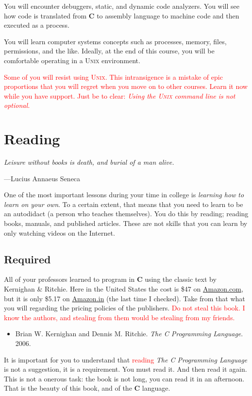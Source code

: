 \documentclass[11pt]{article}
\begin{document}
You will encounter debuggers, static, and dynamic code analyzers. You
will see how code is translated from \textbf{C} to assembly language to
machine code and then executed as a process.

You will learn computer systems concepts such as processes, memory,
files, permissions, and the like. Ideally, at the end of this course,
you will be comfortable operating in a \textsc{Unix} environment.

\textcolor{red}{Some of you will resist using \textsc{Unix}. This
intransigence is a mistake of epic proportions that you will regret when
you move on to other courses. Learn it now while you have support. Just be to clear: \emph{Using the \textsc{Unix} command line is not optional.}}

\section{Reading}
\epigraph{\emph{Leisure without books is death, and burial of a man alive.}}{---Lucius Annaeus Seneca}

One of the most important lessons during your time in college is
\emph{learning how to learn on your own}. To a certain extent, that
means that you need to learn to be an autodidact (a person who
teaches themselves).  You do this by reading; reading books, manuals,
and published articles. These are not skills that you can learn by
only watching videos on the Internet.

\subsection{Required}

All of your professors learned to program in \textbf{C} using the
classic text by Kernighan \& Ritchie.  Here in the United States the
cost is \$47 on \href{https://www.amazon.com}{Amazon.com}, but it is only \$5.17 on
\href{https://amazon.in}{Amazon.in} (the last time I checked). Take from that what you will
regarding the pricing policies of the publishers.
\textcolor{red}{Do not steal this book. I know the authors, and stealing
from them would be stealing from my friends.}

\begin{itemize}
\item
Brian W. Kernighan and Dennis M. Ritchie. \emph{The C Programming Language}. 2006.
\end{itemize}

It is important for you to understand that \textcolor{red}{reading}
\emph{The C Programming Language} is not a suggestion, it is a
requirement. You must read it. And then read it again.  This is
not a onerous task: the book is not long, you can read it in an
afternoon. That is the beauty of this book, and of the \textbf{C}
language.
\end{document}
